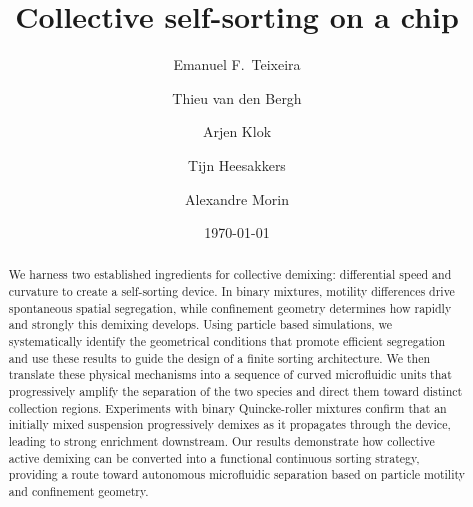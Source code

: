 \documentclass[aps,pre,twocolumn,amsmath,amssymb,notitlepage,superscriptaddress,longbibliography,nofootinbib,10pt]{revtex4-1}
\begin{document}
\title{Collective self-sorting on a chip}

\author{Emanuel F.~Teixeira}

\author{Thieu van den Bergh}

\author{Arjen Klok}

\author{Tijn Heesakkers}

\author{Alexandre Morin}

\date{\today}

\begin{abstract}
We harness two established ingredients for collective demixing: differential speed and curvature to create a self-sorting device. In binary mixtures, motility differences drive spontaneous spatial segregation, while confinement geometry determines how rapidly and strongly this demixing develops. Using particle based simulations, we systematically identify the geometrical conditions that promote efficient segregation and use these results to guide the design of a finite sorting architecture. We then translate these physical mechanisms into a sequence of curved microfluidic units that progressively amplify the separation of the two species and direct them toward distinct collection regions. Experiments with binary Quincke-roller mixtures confirm that an initially mixed suspension progressively demixes as it propagates through the device, leading to strong enrichment downstream. Our results demonstrate how collective active demixing can be converted into a functional continuous sorting strategy, providing a route toward autonomous microfluidic separation based on particle motility and confinement geometry.
\end{abstract}


\maketitle
\end{document}
